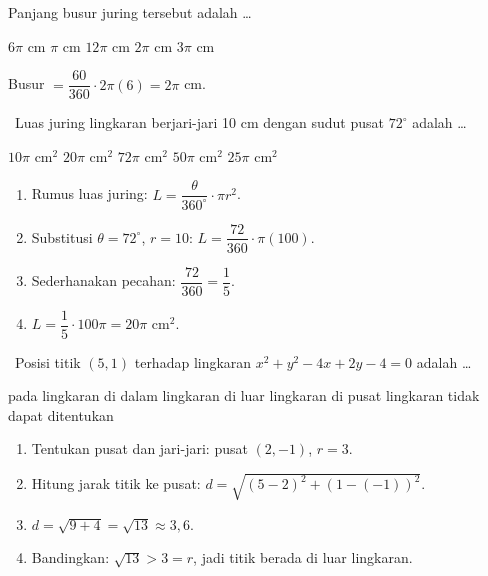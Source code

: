 \documentclass[11pt,a4paper]{exam}
\newenvironment{langkah}{%
  \begin{enumerate}[label=\textbf{Langkah \arabic*:},leftmargin=2.6em,
    itemsep=2pt,topsep=2pt]}{\end{enumerate}}
\newcommand{\Adv}{{\footnotesize\textsf{\textcolor{oranye}{[Advanced]}}}\ }
\begin{document}
\begin{questions}
Panjang busur juring tersebut adalah \dots
\begin{choices}
\choice $6\pi$ cm \choice $\pi$ cm \choice $12\pi$ cm \CorrectChoice $2\pi$ cm \choice $3\pi$ cm
\end{choices}
\begin{solution}Busur $=\dfrac{60}{360}\cdot 2\pi(6)=2\pi$ cm.\end{solution}

\question \Adv Luas juring lingkaran berjari-jari 10 cm dengan sudut pusat
$72^\circ$ adalah \dots
\begin{choices}
\choice $10\pi$ cm$^2$ \CorrectChoice $20\pi$ cm$^2$ \choice $72\pi$ cm$^2$
\choice $50\pi$ cm$^2$ \choice $25\pi$ cm$^2$
\end{choices}
\begin{solution}
\begin{langkah}
\item Rumus luas juring: $L = \dfrac{\theta}{360^\circ}\cdot \pi r^{2}$.
\item Substitusi $\theta=72^\circ$, $r=10$: $L = \dfrac{72}{360}\cdot \pi(100)$.
\item Sederhanakan pecahan: $\dfrac{72}{360} = \dfrac{1}{5}$.
\item $L = \dfrac{1}{5}\cdot 100\pi = 20\pi$ cm$^2$.
\end{langkah}
\end{solution}

\question \Adv Posisi titik $(5,1)$ terhadap lingkaran $x^{2}+y^{2}-4x+2y-4=0$ adalah \dots
\begin{choices}
\choice pada lingkaran
\choice di dalam lingkaran
\CorrectChoice di luar lingkaran
\choice di pusat lingkaran
\choice tidak dapat ditentukan
\end{choices}
\begin{solution}
\begin{langkah}
\item Tentukan pusat dan jari-jari: pusat $(2,-1)$, $r=3$.
\item Hitung jarak titik ke pusat: $d=\sqrt{(5-2)^{2}+(1-(-1))^{2}}$.
\item $d = \sqrt{9+4} = \sqrt{13} \approx 3{,}6$.
\item Bandingkan: $\sqrt{13} > 3 = r$, jadi titik berada di luar lingkaran.
\end{langkah}
\end{solution}


\end{questions}
\end{document}
